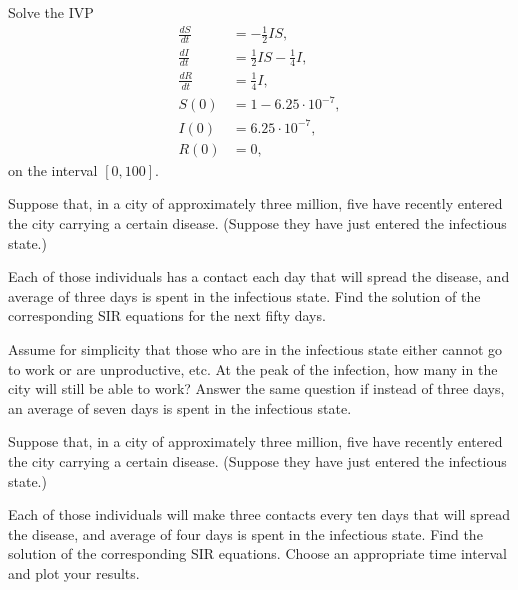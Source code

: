 \begin{problem}
Solve the IVP
\begin{align*}
\frac{dS}{dt} &=-\frac{1}{2} IS ,\\
\frac{dI}{dt} &= \frac{1}{2} I S-\frac{1}{4} I, \\
\frac{dR}{dt} &=\frac{1}{4} I,\\
S(0) &= 1-6.25\cdot10^{-7},\\
I(0) &= 6.25\cdot10^{-7},\\
R(0) &=0,
\end{align*}
on the interval $[0,100]$.
\end{problem}


\begin{problem}
Suppose that, in a city of approximately three million, five have recently entered the city carrying a certain disease. (Suppose they have just entered the infectious state.)

Each of those individuals has a contact each day that will spread the disease, and average of three days is spent in the infectious state. Find the solution of the corresponding SIR equations for the next fifty days. 

Assume for simplicity that those who are in the infectious state either cannot go to work or are unproductive, etc. At the peak of the infection, how many in the city will still be able to work? 
Answer the same question if instead of three days, an average of seven days is spent in the infectious state.
\end{problem}


\begin{problem}
Suppose that, in a city of approximately three million, five have recently entered the city carrying a certain disease. (Suppose they have just entered the infectious state.) 

Each of those individuals will make three contacts every ten days that will spread the disease, and average of four days is spent in the infectious state. Find the solution of the corresponding SIR equations. Choose an appropriate time interval and plot your results.
\end{problem}









